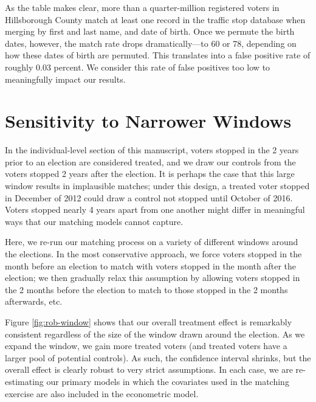 \documentclass[
  12pt,
]{article}
\begin{document}
As the table makes clear, more than a quarter-million registered voters in Hillsborough County match at least one record in the traffic stop database when merging by first and last name, and date of birth. Once we permute the birth dates, however, the match rate drops dramatically---to 60 or 78, depending on how these dates of birth are permuted. This translates into a false positive rate of roughly 0.03 percent. We consider this rate of false positives too low to meaningfully impact our results.

\hypertarget{sensitivity-to-narrower-windows}{%
\section*{Sensitivity to Narrower Windows}\label{sensitivity-to-narrower-windows}}

In the individual-level section of this manuscript, voters stopped in the 2 years prior to an election are considered treated, and we draw our controls from the voters stopped 2 years after the election. It is perhaps the case that this large window results in implausible matches; under this design, a treated voter stopped in December of 2012 could draw a control not stopped until October of 2016. Voters stopped nearly 4 years apart from one another might differ in meaningful ways that our matching models cannot capture.

Here, we re-run our matching process on a variety of different windows around the elections. In the most conservative approach, we force voters stopped in the month before an election to match with voters stopped in the month after the election; we then gradually relax this assumption by allowing voters stopped in the 2 months before the election to match to those stopped in the 2 months afterwards, etc.

Figure \ref{fig:rob-window} shows that our overall treatment effect is remarkably consistent regardless of the size of the window drawn around the election. As we expand the window, we gain more treated voters (and treated voters have a larger pool of potential controls). As such, the confidence interval shrinks, but the overall effect is clearly robust to very strict assumptions. In each case, we are re-estimating our primary models in which the covariates used in the matching exercise are also included in the econometric model.
\end{document}
